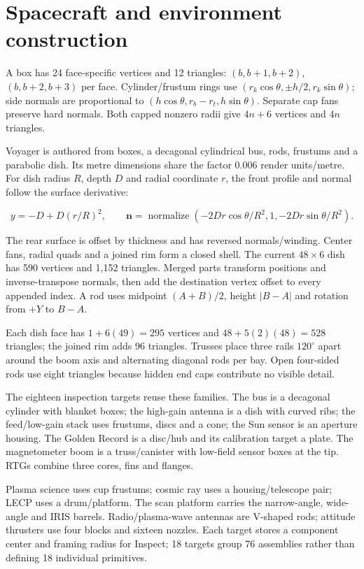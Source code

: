 \documentclass[12pt,a4paper,oneside]{report}
\newcommand{\para}[1]{\par\vspace{12pt}\noindent#1\par}
\begin{document}
\section{Spacecraft and environment construction}\label{sec:objects}
\para{A box has 24 face-specific vertices and 12 triangles: $(b,b+1,b+2)$, $(b,b+2,b+3)$ per face. Cylinder/frustum rings use $(r_k\cos\theta,\pm h/2,r_k\sin\theta)$; side normals are proportional to $(h\cos\theta,r_b-r_t,h\sin\theta)$. Separate cap fans preserve hard normals. Both capped nonzero radii give $4n+6$ vertices and $4n$ triangles.}
\para{Voyager is authored from boxes, a decagonal cylindrical bus, rods, frustums and a parabolic dish. Its metre dimensions share the factor 0.006 render units/metre. For dish radius $R$, depth $D$ and radial coordinate $r$, the front profile and normal follow the surface derivative:}
\begin{equation}
y=-D+D(r/R)^2,\qquad
\mathbf n=\operatorname{normalize}(-2Dr\cos\theta/R^2,1,-2Dr\sin\theta/R^2).
\end{equation}
\para{The rear surface is offset by thickness and has reversed normals/winding. Center fans, radial quads and a joined rim form a closed shell. The current $48\times6$ dish has 590 vertices and 1,152 triangles. Merged parts transform positions and inverse-transpose normals, then add the destination vertex offset to every appended index. A rod uses midpoint $(A+B)/2$, height $|B-A|$ and rotation from $+Y$ to $B-A$.}
\para{Each dish face has $1+6(49)=295$ vertices and $48+5(2)(48)=528$ triangles; the joined rim adds 96 triangles. Trusses place three rails $120^\circ$ apart around the boom axis and alternating diagonal rods per bay. Open four-sided rods use eight triangles because hidden end caps contribute no visible detail.}
\para{The eighteen inspection targets reuse these families. The bus is a decagonal cylinder with blanket boxes; the high-gain antenna is a dish with curved ribs; the feed/low-gain stack uses frustums, discs and a cone; the Sun sensor is an aperture housing. The Golden Record is a disc/hub and its calibration target a plate. The magnetometer boom is a truss/canister with low-field sensor boxes at the tip. RTGs combine three cores, fins and flanges.}
\para{Plasma science uses cup frustums; cosmic ray uses a housing/telescope pair; LECP uses a drum/platform. The scan platform carries the narrow-angle, wide-angle and IRIS barrels. Radio/plasma-wave antennas are V-shaped rods; attitude thrusters use four blocks and sixteen nozzles. Each target stores a component center and framing radius for Inspect; 18 targets group 76 assemblies rather than defining 18 individual primitives.}
\end{document}
